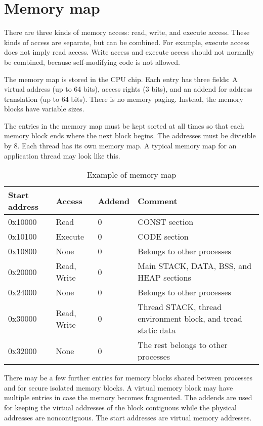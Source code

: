 \documentclass[forwardcom.tex]{subfiles}
\begin{document}
\section{Memory map}
There are three kinds of memory access: read, write, and execute access. These kinds of access are separate, but can be combined. For example, execute access does not imply read access. Write access and execute access should not normally be combined, because self-modifying code is not allowed.
\vspace{2mm}

The memory map is stored in the CPU chip. Each entry has three fields: A virtual address (up to 64 bits), access rights (3 bits), and an addend for address translation (up to 64 bits). There is no memory paging. Instead, the memory blocks have variable sizes.
\vspace{2mm}

The entries in the memory map must be kept sorted at all times so that each memory block ends where the next block begins. The addresses must be divisible by 8. Each thread has its own memory map. A typical memory map for an application thread may look like this.

\begin{longtable} {|p{22mm}|p{20mm}|p{20mm}|p{70mm}|}
\caption{Example of memory map} \\
\endfirsthead
\endhead
\hline
\bfseries Start address & \bfseries Access & \bfseries Addend & \bfseries Comment  \\
\hline
0x10000   & Read    & 0 & CONST section \\
0x10100   & Execute & 0 & CODE section \\
0x10800   & None    & 0 & Belongs to other processes \\
0x20000   & Read, Write & 0 & Main STACK, DATA, BSS, and HEAP sections \\
0x24000   & None    & 0 & Belongs to other processes \\
0x30000   & Read, Write & 0 & Thread STACK, thread environment block, and tread static data \\
0x32000   & None    & 0 & The rest belongs to other processes \\
\hline
\end{longtable}

There may be a few further entries for memory blocks shared between processes and for secure isolated memory blocks. A virtual memory block may have multiple entries in case the memory becomes fragmented. The addends are used for keeping the virtual addresses of the block contiguous while the physical addresses are noncontiguous. The start addresses are virtual memory addresses.
\vspace{2mm}
\end{document}
